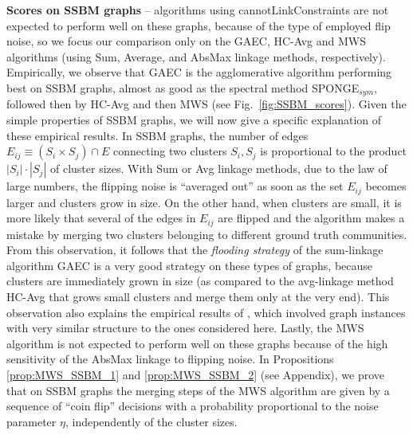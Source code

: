 \textbf{Scores on SSBM graphs}  -- 
\algname{} algorithms using cannotLinkConstraints are not expected to perform well on these graphs, because of the type of employed flip noise, so we focus our comparison only on the GAEC, HC-Avg and MWS algorithms (using Sum, Average, and AbsMax linkage methods, respectively).
Empirically, we observe that GAEC is the agglomerative algorithm performing best on SSBM graphs, almost as good as the spectral method SPONGE$_{sym}$, followed then by HC-Avg and then MWS (see Fig.~\ref{fig:SSBM_scores}). Given the simple properties of SSBM graphs, we will now give a specific explanation of these empirical results. 
In SSBM graphs, the number of edges $E_{ij}\equiv(S_i\times S_j)\cap E$ connecting two clusters $S_i,S_j$ is  proportional to the product $|S_i|\cdot|S_j|$ of cluster sizes. With Sum or Avg linkage methods, due to the law of large numbers, the flipping noise is ``averaged out'' as soon as the set $E_{ij}$ becomes larger and clusters grow in size. On the other hand, when clusters are small, it is more likely that several of the edges in $E_{ij}$ are flipped and the algorithm makes a mistake by merging two clusters belonging to different ground truth communities. From this observation, it follows that the \emph{flooding strategy} of the sum-linkage algorithm GAEC is a very good strategy on these types of graphs, because clusters are immediately grown in size (as compared to the avg-linkage method HC-Avg that grows small clusters and merge them only at the very end). This observation also explains the empirical results of \cite{chehreghani2020hierarchical}, which involved graph instances with very similar structure to the ones considered here. Lastly, the MWS algorithm is not expected to perform well on these graphs because of the high sensitivity of the AbsMax linkage to flipping noise. In Propositions \ref{prop:MWS_SSBM_1} and \ref{prop:MWS_SSBM_2} (see Appendix), we prove that on SSBM graphs the merging steps of the MWS algorithm are given by a sequence of ``coin flip'' decisions with a probability proportional to the noise parameter $\eta$, independently of the cluster sizes.
 


